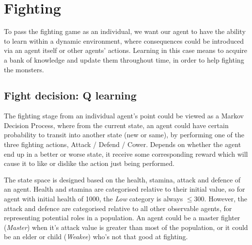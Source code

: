 \section{Fighting}
To pass the fighting game as an individual, we want our agent to have the ability to learn within a dynamic environment, where consequences could be introduced via an agent itself or other agents' actions. Learning in this case means to acquire a bank of knowledge and update them throughout time, in order to help fighting the monsters.

\subsection{Fight decision: Q learning}
The fighting stage from an individual agent's point could be viewed as a Markov Decision Process, where from the current state, an agent could have certain probability to transit into another state (new or same), by performing one of the three fighting actions, Attack / Defend / Cower. Depends on whether the agent end up in a better or worse state, it receive some corresponding reward which will cause it to like or dislike the action just being performed.

The state space is designed based on the health, stamina, attack and defence of an agent. Health and stamina are categorised relative to their initial value, so for agent with initial health of 1000, the \textit{Low} category is always $\leq 300$. However, the attack and defence are categorised relative to all other observable agents, for representing potential roles in a population. An agent could be a master fighter (\textit{Master}) when it's attack value is greater than most of the population, or it could be an elder or child (\textit{Weakee}) who's not that good at fighting.

